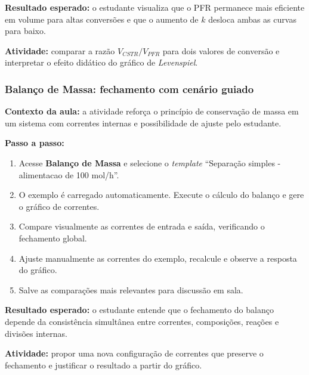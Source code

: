 \textbf{Resultado esperado:} o estudante visualiza que o PFR permanece mais eficiente em volume para altas conversões e que o aumento de $k$ desloca ambas as curvas para baixo.

\textbf{Atividade:} comparar a razão $V_{CSTR}/V_{PFR}$ para dois valores de conversão e interpretar o efeito didático do gráfico de \textit{Levenspiel}.

\subsubsection{Balanço de Massa: fechamento com cenário guiado}

\textbf{Contexto da aula:} a atividade reforça o princípio de conservação de massa em um sistema com correntes internas e possibilidade de ajuste pelo estudante.

\textbf{Passo a passo:}
\begin{enumerate}
    \item Acesse \textbf{Balanço de Massa} e selecione o \textit{template} ``Separação simples - alimentacao de 100 mol/h''.
    \item O exemplo é carregado automaticamente. Execute o cálculo do balanço e gere o gráfico de correntes.
    \item Compare visualmente as correntes de entrada e saída, verificando o fechamento global.
    \item Ajuste manualmente as correntes do exemplo, recalcule e observe a resposta do gráfico.
    \item Salve as comparações mais relevantes para discussão em sala.
\end{enumerate}

\textbf{Resultado esperado:} o estudante entende que o fechamento do balanço depende da consistência simultânea entre correntes, composições, reações e divisões internas.

\textbf{Atividade:} propor uma nova configuração de correntes que preserve o fechamento e justificar o resultado a partir do gráfico.
